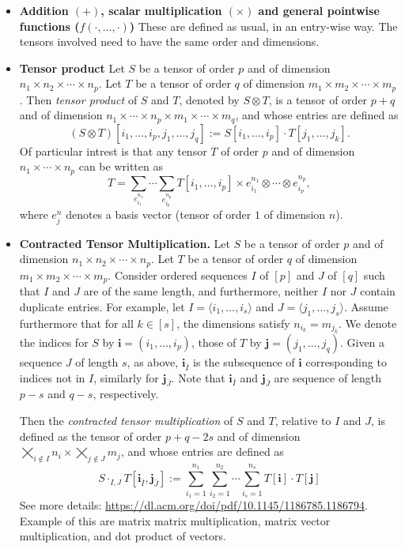 \begin{itemize}
\item \textbf{Addition $(+)$, scalar multiplication $(\times)$ and general pointwise functions ($f(\cdot,\ldots,\cdot)$)} These are defined as usual, in an entry-wise way. The tensors involved need to have the same order and dimensions.

\item \textbf{Tensor product} Let $S$ be a tensor of order $p$ and of dimension $n_1\times n_2\times\cdots\times n_p$. Let 
$T$ be a tensor of order $q$ of dimension $m_1\times m_2\times\cdots\times m_p$. Then \textit{tensor product} of $S$ and $T$, denoted by $S\otimes T$, is a tensor of order $p+q$ and of dimension 
$n_1\times\cdots\times n_p\times m_1\times\cdots\times m_q$, and whose entries are defined as
$$
(S\otimes T)[i_1,\ldots,i_p,j_1,\ldots,j_q]:=S[i_1,\ldots,i_p]\cdot T[j_1,\ldots,j_k].
$$
Of particular intrest is that any tensor $T$ of order $p$ and of dimension $n_1\times\cdots\times n_p$ can be written as 
$$
T=\sum_{e_{i_1}^{n_1}}\cdots \sum_{e_{i_p}^{n_p}} T[i_1,\ldots,i_p]\times e_{i_1}^{n_1}\otimes \cdots \otimes e_{i_p}^{n_p},$$
where $e_j^n$ denotes a basis vector (tensor of order $1$ of dimension $n$).

\item \textbf{Contracted Tensor Multiplication.} Let $S$ be a tensor of order $p$ and of dimension $n_1\times n_2\times\cdots\times n_p$. Let 
$T$ be a tensor of order $q$ of dimension $m_1\times m_2\times\cdots\times m_p$. Consider ordered sequences $I$ of $[p]$ and $J$ of $[q]$ such that $I$ and $J$
are of the same length, and furthermore, neither $I$ nor $J$ contain duplicate entries.
For example, let $I=\langle i_1,\ldots,i_s\rangle$ and $J=\langle j_1,\ldots,j_s\rangle$. Assume furthermore that for all $k\in[s]$, the dimensions satisfy $n_{i_k}=m_{j_k}$. We denote the
indices for $S$ by $\mathbf{i}=(i_1,\ldots,i_p)$, those of $T$ by $\mathbf{j}=(j_1,\ldots,j_q)$. Given a sequence
$J$ of length $s$, as above, $\mathbf{i}_{\bar I}$ is the subsequence of $\mathbf{i}$ corresponding to indices not in $I$, similarly for $\mathbf{j}_{\bar J}$. Note that $\mathbf{i}_{\bar I}$ and $\mathbf{j}_{\bar J}$ are sequence of length $p-s$ and $q-s$, respectively.

Then the \textit{contracted tensor multiplication} of $S$ and $T$, relative to $I$ and $J$, is defined as the tensor
of order $p+q-2s$ and of dimension $\bigtimes_{ i\not\in I} n_i\times \bigtimes_{j\not \in J} m_j$, and whose entries are defined as
$$
S\cdot_{I,J} T[\mathbf{i}_{\bar I},\mathbf{j}_{\bar J}]:=\sum_{i_1=1}^{n_1}\sum_{i_2=1}^{n_2}\cdots\sum_{i_s=1}^{n_s} T[\mathbf{i}]\cdot T[\mathbf{j}]
$$
See more details: \url{https://dl.acm.org/doi/pdf/10.1145/1186785.1186794}. Example of this are matrix matrix multiplication, matrix vector multiplication, and dot product of vectors.


\end{itemize}
